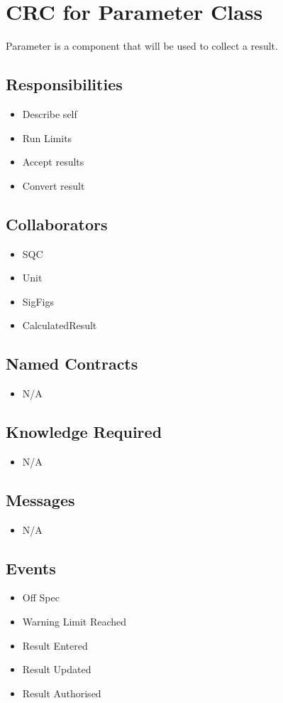\documentclass[11pt,twocolumn]{article}
\begin{document}
\section*{CRC for Parameter Class}
 Parameter is a component that will be used to collect a result. 
\subsection*{Responsibilities}
\begin{itemize}
\item Describe self
\item Run Limits
\item Accept results
\item Convert result
\end{itemize}

\subsection*{Collaborators}
\begin{itemize}
\item SQC 
\item Unit
\item SigFigs
\item CalculatedResult
\end{itemize}

\subsection*{Named Contracts}
\begin{itemize}
\item N/A
\end{itemize}

\subsection*{Knowledge Required}
\begin{itemize}
\item N/A
\end{itemize}

\subsection*{Messages}
\begin{itemize}
\item N/A
\end{itemize}

\subsection*{Events}
\begin{itemize}
\item Off Spec
\item Warning Limit Reached
\item Result Entered
\item Result Updated
\item Result Authorised
\end{itemize}
\end{document}
